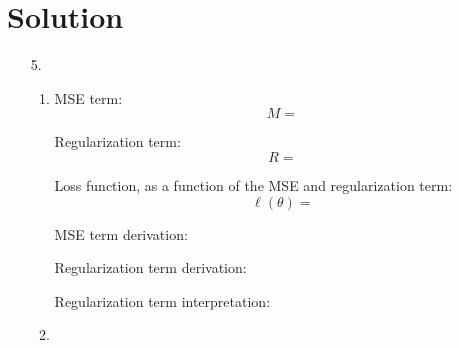 \documentclass[submit]{harvardml}
\newenvironment{answer}
  {\section*{Solution}}
{}
\begin{document}
\begin{answer}
\begin{enumerate}
\begin{enumerate}
      \end{enumerate}

    \item[5.]

      \begin{enumerate}
        \item
              MSE term:
              \[
                M =
              \]

              Regularization term:
              \[
                R =
              \]

              Loss function, as a function of the MSE and regularization term:
              \[
                \ell(\theta) =
              \]

              MSE term derivation:

              Regularization term derivation:

              Regularization term interpretation:

        \item

      \end{enumerate}

  \end{enumerate}
\end{answer}


\newpage

\end{document}

